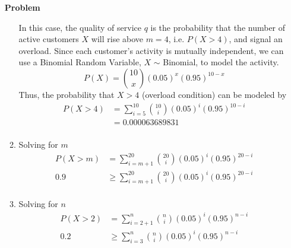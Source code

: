 \documentclass[12pt]{article}
\newenvironment{Ex}{\textbf{Problem}\vspace{.75em}\\}{}
\begin{document}
\begin{enumerate}
\begin{Ex}
\begin{solution}
\begin{enumerate}
          In this case, the quality of service $q$ is the probability
          that the number of active customers $X$ will rise above
          $m=4$, i.e. $P(X>4)$, and signal an overload. Since each
          customer's activity is mutually independent, we can use a
          Binomial Random Variable, $X$ $\sim$ Binomial, to model the
          activity.
          \begin{equation}
            \label{eq:5-p-desc}
            P(X) = {10 \choose x} (0.05)^x(0.95)^{10-x}
          \end{equation}
          Thus, the probability that $X>4$ (overload condition) can be
          modeled by
          \begin{equation}
            \label{eq:5-p-sol}
            \begin{aligned}
              P(X>4) &= \sum_{i=5}^{10} {10 \choose i}
              (0.05)^i(0.95)^{10-i} \\
              &= 0.000063689831 \\
            \end{aligned}
          \end{equation}
        \item Solving for $m$
          \begin{equation}
            \label{eq:5-p-sol}
            \begin{aligned}
              P(X>m) &= \sum_{i=m+1}^{20} {20 \choose i}
              (0.05)^i(0.95)^{20-i} \\
              0.9 &\ge \sum_{i=m+1}^{20} {20 \choose i}
              (0.05)^i(0.95)^{20-i} \\
            \end{aligned}
          \end{equation}
        \item Solving for $n$
          \begin{equation}
            \label{eq:5-p-sol}
            \begin{aligned}
              P(X>2) &= \sum_{i=2+1}^{n} {n \choose i}
              (0.05)^i(0.95)^{n-i} \\
              0.2 &\ge \sum_{i=3}^{n} {n \choose i}
              (0.05)^i(0.95)^{n-i} \\
            \end{aligned}
          \end{equation}
        \end{enumerate}
      \end{solution}
    \end{Ex}

\end{enumerate}
\end{document}
